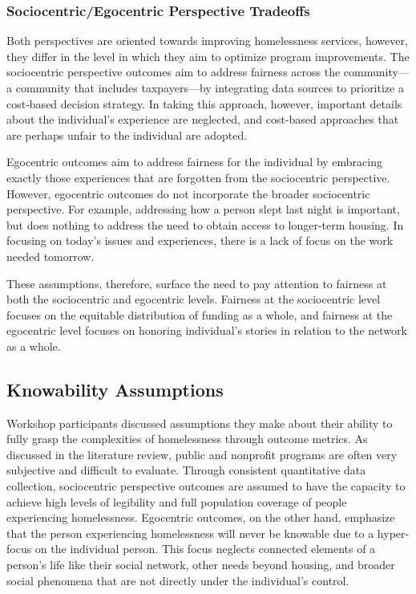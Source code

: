 \subsubsection{Sociocentric/Egocentric Perspective Tradeoffs}
Both perspectives are oriented towards improving homelessness services, however, they differ in the level in which they aim to optimize program improvements. The sociocentric perspective outcomes aim to address fairness across the community---a community that includes taxpayers---by integrating data sources to prioritize a cost-based decision strategy. In taking this approach, however, important details about the individual's experience are neglected, and cost-based approaches that are perhaps unfair to the individual are adopted.

Egocentric outcomes aim to address fairness for the individual by embracing exactly those experiences that are forgotten from the sociocentric perspective. However, egocentric outcomes do not incorporate the broader sociocentric perspective. For example, addressing how a person slept last night is important, but does nothing to address the need to obtain access to longer-term housing. In focusing on today's issues and experiences, there is a lack of focus on the work needed tomorrow.

These assumptions, therefore, surface the need to pay attention to fairness at both the sociocentric and egocentric levels. Fairness at the sociocentric level focuses on the equitable distribution of funding as a whole, and fairness at the egocentric level focuses on honoring individual's stories in relation to the network as a whole.


\subsection{Knowability Assumptions}
Workshop participants discussed assumptions they make about their ability to fully grasp the complexities of homelessness through outcome metrics. As discussed in the literature review, public and nonprofit programs are often very subjective and difficult to evaluate. Through consistent quantitative data collection, sociocentric perspective outcomes are assumed to have the capacity to achieve high levels of legibility and full population coverage of people experiencing homelessness. Egocentric outcomes, on the other hand, emphasize that the person experiencing homelessness will never be knowable due to a hyper-focus on the individual person. This focus neglects connected elements of a person's life like their social network, other needs beyond housing, and broader social phenomena that are not directly under the individual's control.

